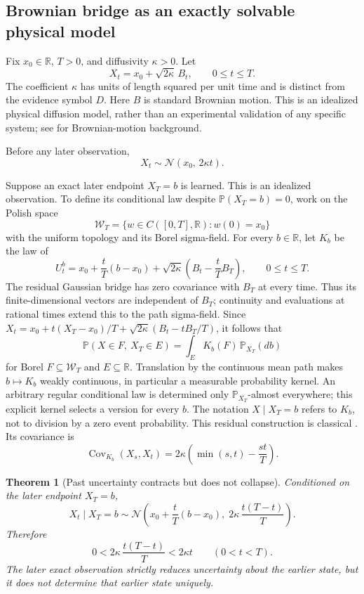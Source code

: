 \documentclass[11pt]{article}
\newtheorem{theorem}[definition]{Theorem}
\newcommand{\Wcal}{\mathcal W}
\begin{document}
\subsection{Brownian bridge as an exactly solvable physical model}

Fix $x_0\in\mathbb R$, $T>0$, and diffusivity $\kappa>0$. Let
\[
X_t=x_0+\sqrt{2\kappa}\,B_t,\qquad 0\le t\le T.
\]
The coefficient $\kappa$ has units of length squared per unit time
and is distinct from the evidence symbol $D$.
Here $B$ is standard Brownian motion. This is an idealized physical
diffusion model, rather than an experimental validation of any specific
system; see \cite{KaratzasShreve1998} for Brownian-motion background.

Before any later observation,
\[
X_t\sim
\mathcal N(x_0,\,2\kappa t).
\]

Suppose an exact later endpoint $X_T=b$ is learned.
This is an idealized observation. To define its conditional law despite
$\mathbb P(X_T=b)=0$, work on the Polish space
\[
\Wcal_T=\{w\in C([0,T],\mathbb R):w(0)=x_0\}
\]
with the uniform topology and its Borel sigma-field.
For every $b\in\mathbb R$, let $K_b$ be the law of
\[
U_t^b=x_0+\frac tT(b-x_0)
+\sqrt{2\kappa}\left(B_t-\frac tT B_T\right),
\qquad 0\le t\le T.
\]
The residual Gaussian bridge has zero covariance with $B_T$ at every
time. Thus its finite-dimensional vectors are independent of $B_T$;
continuity and evaluations at rational times extend this to the path
sigma-field. Since $X_t= x_0+t(X_T-x_0)/T+
\sqrt{2\kappa}(B_t-tB_T/T)$, it follows that
\[
\mathbb P(X\in F,\ X_T\in E)
=\int_E K_b(F)\,\mathbb P_{X_T}(db)
\]
for Borel $F\subseteq\Wcal_T$ and $E\subseteq\mathbb R$.
Translation by the continuous mean path makes $b\mapsto K_b$ weakly
continuous, in particular a measurable probability kernel.
An arbitrary regular conditional law is determined only
$\mathbb P_{X_T}$-almost everywhere; this explicit kernel selects a
version for every $b$. The notation $X\mid X_T=b$ refers to $K_b$,
not to division by a zero event probability. This residual construction
is classical \cite[Theorem 22.1 and the following remark]{Pitman2003}.
Its covariance is
\[
\operatorname{Cov}_{K_b}(X_s,X_t)
=2\kappa\left(\min(s,t)-\frac{st}{T}\right).
\]

\begin{theorem}[Past uncertainty contracts but does not collapse]
\label{thm:brownian-bridge}
Conditioned on the later endpoint \(X_T=b\),
\[
X_t\mid X_T=b
\sim
\mathcal N\!\left(
x_0+\frac{t}{T}(b-x_0),
\;
2\kappa\,\frac{t(T-t)}{T}
\right).
\]
Therefore
\[
0<
2\kappa\,\frac{t(T-t)}{T}
<
2\kappa t
\qquad
(0<t<T).
\]
The later exact observation strictly reduces uncertainty about the earlier state, but it does
not determine that earlier state uniquely.
\end{theorem}
\end{document}
